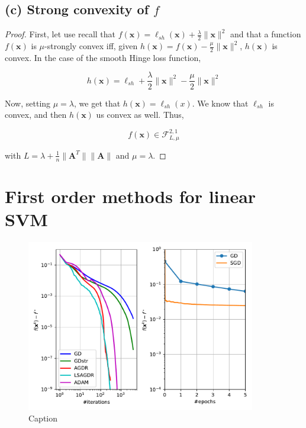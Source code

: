 \documentclass[12pt]{article}
\newcommand{\xb}{\mathbf{x}}
\newcommand{\xnorm}{\lVert \mathbf{\xb} \rVert}
\newcommand{\ellsh}{\ell_{sh}}
\begin{document}
\subsection*{(c) Strong convexity of $f$}
\begin{proof}
First, let use recall that $f(\xb) = \ellsh(\xb) + \frac{\lambda}{2} \xnorm^2$ and that a function $f(\xb)$ is $\mu$-strongly convex iff, given $h(\xb) = f(\xb) - \frac{\mu}{2} \xnorm^2$, $h(\xb)$ is convex. In the case of the smooth Hinge loss function,

\begin{equation}
    h(\xb) = \ellsh + \frac{\lambda}{2} \xnorm^2 - \frac{\mu}{2} \xnorm^2
\end{equation}

Now, setting $\mu = \lambda$, we get that $h(\xb) = \ellsh(x)$. We know that $\ellsh$ is convex, and then $h(\xb)$ us convex as well. Thus,

\begin{equation}
    f(\xb) \in \mathcal{F}_{L, \mu}^{2, 1}
\end{equation}

with $L = \lambda + \frac{1}{n} \lVert \mathbf{A}^T \rVert \lVert \mathbf{A} \rVert$ and $\mu = \lambda$.

\end{proof}

\section*{First order methods for linear SVM}

\begin{figure}[h]
    \centering
    \includegraphics[width=10cm]{hw1/codes/fig_ex1.pdf}
    \caption{Caption}
    \label{fig:my_label}
\end{figure}
\end{document}
